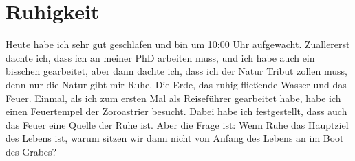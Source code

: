 \documentclass[a4paper]{article}
\begin{document}
    
    \section{Ruhigkeit}
        Heute habe ich sehr gut geschlafen und bin um 10:00 Uhr aufgewacht. Zuallererst dachte ich, dass ich an meiner PhD arbeiten muss, und ich habe auch ein bisschen gearbeitet, aber dann dachte ich, dass ich der Natur Tribut zollen muss, denn nur die Natur gibt mir Ruhe. Die Erde, das ruhig fließende Wasser und das Feuer. Einmal, als ich zum ersten Mal als Reiseführer gearbeitet habe, habe ich einen Feuertempel der Zoroastrier besucht. Dabei habe ich festgestellt, dass auch das Feuer eine Quelle der Ruhe ist. Aber die Frage ist: Wenn Ruhe das Hauptziel des Lebens ist, warum sitzen wir dann nicht von Anfang des Lebens an im Boot des Grabes?
    
    
\end{document}
